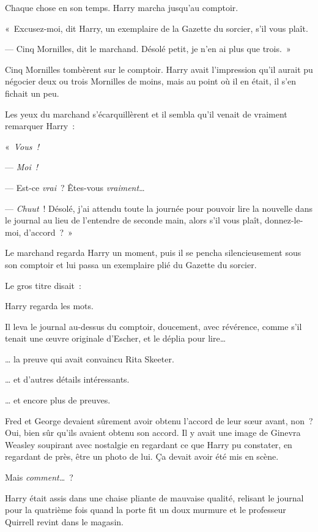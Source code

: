 Chaque chose en son temps. Harry marcha jusqu'au comptoir.

«~Excusez-moi, dit Harry, un exemplaire de la Gazette du sorcier, s'il vous plaît.

--- Cinq Mornilles, dit le marchand. Désolé petit, je n'en ai plus que trois.~»

Cinq Mornilles tombèrent sur le comptoir. Harry avait l'impression qu'il aurait pu négocier deux ou trois Mornilles de moins, mais au point où il en était, il s'en fichait un peu.

Les yeux du marchand s'écarquillèrent et il sembla qu'il venait de vraiment remarquer Harry~:

«~\emph{Vous~!}

--- \emph{Moi~!}

--- Est-ce \emph{vrai}~? Êtes-vous \emph{vraiment}…

--- \emph{Chuut}~! Désolé, j'ai attendu toute la journée pour pouvoir lire la nouvelle dans le journal au lieu de l'entendre de seconde main, alors s'il vous plaît, donnez-le-moi, d'accord~?~»

Le marchand regarda Harry un moment, puis il se pencha silencieusement sous son comptoir et lui passa un exemplaire plié du Gazette du sorcier.

Le gros titre disait~:

Harry regarda les mots.

Il leva le journal au-dessus du comptoir, doucement, avec révérence, comme s'il tenait une œuvre originale d'Escher, et le déplia pour lire…

… la preuve qui avait convaincu Rita Skeeter.

… et d'autres détails intéressants.

… et encore plus de preuves.

Fred et George devaient sûrement avoir obtenu l'accord de leur sœur avant, non~? Oui, bien sûr qu'ils avaient obtenu son accord. Il y avait une image de Ginevra Weasley soupirant avec nostalgie en regardant ce que Harry pu constater, en regardant de près, être un photo de lui. Ça devait avoir été mis en scène.

Mais \emph{comment…}~?

Harry était assis dans une chaise pliante de mauvaise qualité, relisant le journal pour la quatrième fois quand la porte fit un doux murmure et le professeur Quirrell revint dans le magasin.

